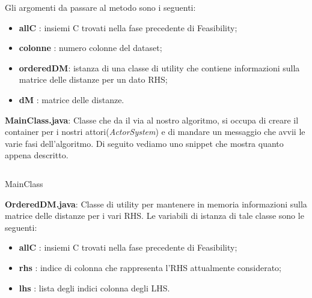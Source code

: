 Gli argomenti da passare al metodo sono i seguenti:
\begin{itemize}
	\item \textbf{allC} : insiemi C trovati nella fase precedente di Feasibility;
	\item \textbf{colonne} : numero colonne del dataset;
	\item \textbf{orderedDM}:  istanza di una classe di utility che contiene informazioni sulla matrice delle distanze per un dato RHS;
	\item \textbf{dM} : matrice delle distanze.
\end{itemize}
\textbf{MainClass.java}:
Classe che da il via al nostro algoritmo, si occupa di creare il container per i nostri attori(\emph{ActorSystem}) e di mandare un messaggio che avvii le varie fasi dell'algoritmo.
Di seguito vediamo uno snippet che mostra quanto appena descritto.
\begin{listing}[H]
	\inputminted[]{java}{Codici/MainClass.java}
	\caption{MainClass}
	\label{Code:7}
\end{listing}
\textbf{OrderedDM.java}:
Classe di utility per mantenere in memoria informazioni sulla matrice delle distanze per i vari RHS.
Le variabili di istanza di tale classe sono le seguenti:
\begin{itemize}
	\item \textbf{allC} : insiemi C trovati nella fase precedente di Feasibility;
	\item \textbf{rhs} : indice di colonna che rappresenta l'RHS attualmente considerato;
	\item \textbf{lhs} : lista degli indici colonna degli LHS.
\end{itemize}
